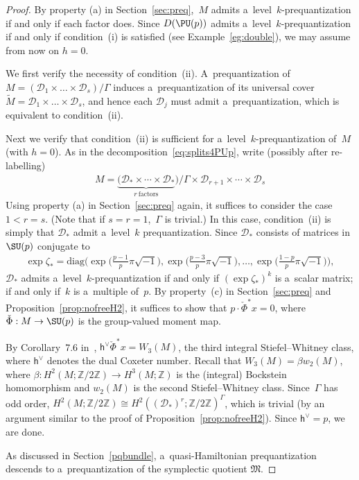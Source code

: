 \begin{proof}
By property (a) in Section~\ref{sec:preq},~$M$ admits a~level~$k$-prequantization if and only if each factor does.
Since $D(\PU(p))$ admits a~level~$k$-prequantization if and only if condition~(i) %
is satisf\/ied (see Example~\ref{eg:double}), we may assume from now on $h=0$.

We f\/irst verify the necessity of condition~(ii). %
A~prequantization of $M=(\mathcal{D}_1 \times \dots \times \mathcal{D}_s) /\Gamma$ induces a~prequantization of its
universal cover $\tilde{M}=\mathcal{D}_1 \times \dots \times \mathcal{D}_s$, and hence each $\mathcal{D}_j$ must admit
a~prequantization, which is equivalent to condition~(ii). %

Next we verify that condition~(ii) %
is suf\/f\/icient for a~level~$k$-prequantization of~$M$ (with $h=0$).
As in the decomposition~\eqref{eq:splits4PUp}, write (possibly after re-labelling)
\begin{gather*}
M=\underbrace{(\mathcal{D}_* \times \cdots \times \mathcal{D}_*}_{r~\text{factors}})/\Gamma \times \mathcal{D}_{r+1}
\times \cdots \times \mathcal{D}_s
\end{gather*}
Using property (a) in Section~\ref{sec:preq} again, it suf\/f\/ices to consider the case $1<r=s$.
(Note that if $s=r=1$,~$\Gamma$ is trivial.) In this case, condition~(ii) %
is simply that $\mathcal{D}_*$ admit a~level~$k$ prequantization.
Since $\mathcal{D}_*$ consists of matrices in $\SU(p)$ conjugate to
\begin{gather*}
\exp \zeta_* = \mathrm{diag}\big(\exp\big(\tfrac{p-1}{p}\pi\sqrt{-1}\big), \exp\big(\tfrac{p-3}{p}\pi\sqrt{-1}\big), \dots,
\exp\big(\tfrac{1-p}{p}\pi\sqrt{-1}\big)\big),
\end{gather*}
$\mathcal{D}_*$ admits a~level~$k$-prequantization if and only if $(\exp \zeta_*)^k$ is a~scalar matrix; if and only
if~$k$ is a~multiple of~$p$.
By property~(c) in Section~\ref{sec:preq} and Proposition~\ref{prop:nofreeH2}, it suf\/f\/ices to show that
$p\cdot\check{\Phi}^*x =0$, where $\check{\Phi}:M\to \SU(p)$ is the group-valued moment map.

By Corollary~7.6 in~\cite{AM}, $\mathsf{h}^\vee \check{\Phi}^*x=W_3(M)$, the third integral Stiefel--Whitney class, where
$\mathsf{h}^\vee$ denotes the dual Coxeter number.
Recall that $W_3(M)=\beta w_2(M)$, where $\beta: H^2(M;{\mathbb{Z}}/2{\mathbb{Z}}) \to H^3(M;{\mathbb{Z}})$ is the
(integral) Bockstein homomorphism and $w_2(M)$ is the second Stiefel--Whitney class.
Since~$\Gamma$ has odd order, $H^2(M;{\mathbb{Z}}/2{\mathbb{Z}}) \cong
H^2((\mathcal{D}_*)^r;{\mathbb{Z}}/2{\mathbb{Z}})^\Gamma$, which is trivial (by an argument similar to the proof of
Proposition~\ref{prop:nofreeH2}).
Since $\mathsf{h}^\vee=p$, we are done.

As discussed in Section~\ref{pqbundle}, a~quasi-Hamiltonian prequantization descends to a~prequantization of the
symplectic quotient $\mathfrak{M}$.
\end{proof}
